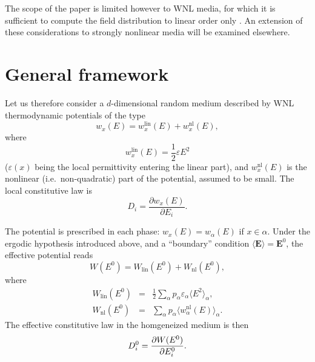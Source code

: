 The scope of the paper is limited however to WNL media, for which it
is sufficient to compute the field distribution to linear order only
\cite{AHAR87,STRO88}. An extension of these considerations to
strongly nonlinear media will be examined elsewhere.

\section{General framework}
\label{th}
Let us therefore consider a $d$-dimensional random medium described
by WNL thermodynamic potentials of the type
\begin{equation}
\label{orig}
w_x(E)=w_x^{\text{lin}}(E) +w_x^{\text{nl}}(E),
\end{equation}
where
\begin{equation}
w_x^{\text{lin}}(E)=\frac{1}{2} \varepsilon E^2
\end{equation}
($\varepsilon(x)$ being the local permittivity entering the linear part),
and $w_x^{\text{nl}}(E)$ is the nonlinear (i.e.\ non-quadratic) part of
the potential, assumed to be small. The local constitutive law is
\begin{equation}
D_i=\frac{\partial w_x(E)}{\partial E_i}.
\end{equation}

The potential is prescribed in each phase: $w_x(E)=w_\alpha(E)$ if $x\in\alpha$.
Under the ergodic hypothesis introduced above, and a ``boundary'' condition
\cite{NOTE1} $\langle{\mathbf{E}}\rangle={\mathbf{E}}^0$, the effective
potential reads
\begin{equation}
W(E^0)=W_{\text{lin}}(E^0)+W_{\text{nl}}(E^0),
\end{equation}
where
\begin{eqnarray}
\label{lin}
W_{\text{lin}}(E^0)&=&\frac{1}{2}\sum_\alpha p_\alpha \varepsilon_\alpha
\langle E^2\rangle_\alpha,\\
\label{nonlin}
W_{\text{nl}}(E^0)&=&\sum_\alpha p_\alpha \langle w_\alpha^{\text{nl}}(E)
\rangle_\alpha.
\end{eqnarray}
The effective constitutive law in the homgeneized medium is then
\begin{equation}
\label{constithom}
D^0_i={\partial W(E^0)\over \partial E^0_i}.
\end{equation}

